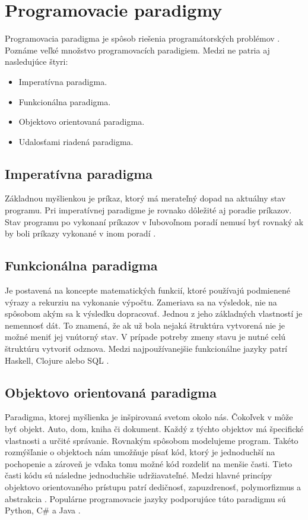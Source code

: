\section{Programovacie paradigmy}
\noindent Programovacia paradigma je spôsob riešenia programátorských problémov \cite{Samuel2018AnII}. Poznáme veľké množstvo programovacích paradigiem. Medzi ne patria aj nasledujúce štyri:
\begin{itemize}
  \item Imperatívna paradigma.
  \item Funkcionálna paradigma.
  \item Objektovo orientovaná paradigma.
  \item Udalosťami riadená paradigma.
\end{itemize}

\subsection{Imperatívna paradigma}
\noindent Základnou myšlienkou je príkaz, ktorý má merateľný dopad na aktuálny stav 
programu. Pri imperatívnej paradigme je rovnako dôležité aj poradie príkazov. Stav 
programu po vykonaní príkazov v ľubovoľnom poradí nemusí byť rovnaký ak by boli príkazy 
vykonané v inom poradí \cite{imperativParadigm}. 

\subsection{Funkcionálna paradigma}
\noindent Je postavená na koncepte matematických funkcií, ktoré používajú podmienené 
výrazy a rekurziu na vykonanie výpočtu. Zameriava sa na výsledok, nie na spôsobom akým 
sa k výsledku dopracovať. Jednou z jeho základných vlastností je nemennosť dát. To 
znamená, že ak už bola nejaká štruktúra vytvorená nie je možné meniť jej vnútorný stav. 
V prípade potreby zmeny stavu je nutné celú štruktúru vytvoriť odznova. Medzi 
najpoužívanejšie funkcionálne jazyky patrí Haskell, Clojure alebo SQL \cite{functionalParadigm}.

\subsection{Objektovo orientovaná paradigma}
\noindent Paradigma, ktorej myšlienka je inšpirovaná svetom okolo nás. Čokoľvek v môže 
byť objekt. Auto, dom, kniha či dokument. Každý z týchto objektov má špecifické vlastnosti 
a určité správanie. Rovnakým spôsobom modelujeme program. Takéto rozmýšľanie o 
objektoch nám umožňuje písať kód, ktorý je jednoduchší na pochopenie a zároveň je 
vďaka tomu možné kód rozdeliť na menšie časti. Tieto časti kódu sú následne 
jednoduchšie udržiavateľné. Medzi hlavné princípy objektovo orientovaného prístupu 
patrí dedičnosť, zapuzdrenosť, polymorfizmus a abstrakcia \cite{objectOrientedParadigm}
. Populárne programovacie jazyky podporujúce túto paradigmu sú Python, C\# a Java \cite
{stack-overflow-survey-2020}.

